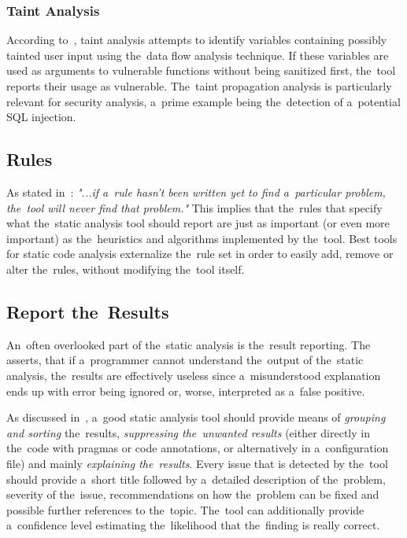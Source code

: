 \documentclass[
  digital, %
  table,   %
  lof,     %
  lot,     %
  oneside,
]{fithesis3}
\begin{document}
\subsubsection{\textbf{Taint Analysis}}
According to~\cite{oswap-sca}, taint analysis attempts to identify variables containing possibly tainted user input using the~data flow analysis technique. If these variables are used as arguments to vulnerable functions without being sanitized first, the~tool reports their usage as vulnerable. The~taint propagation analysis is particularly relevant for security analysis, a~prime example being the~detection of a~potential SQL injection.

\subsection{Rules}
As stated in~\cite{sca-for-security}: \textit{"...if a~rule hasn’t been written yet to find a~particular problem, the~tool will never find that problem."} This implies that the~rules that specify what the~static analysis tool should report are just as important (or even more important) as the~heuristics and algorithms implemented by the~tool. Best tools for static code analysis externalize the~rule set in order to easily add, remove or alter the~rules, without modifying the~tool itself.

\subsection{Report the~Results}
An~often overlooked part of the~static analysis is the~result reporting. The~\cite{coverity-sca} asserts, that if a~programmer cannot understand the~output of the~static analysis, the~results are effectively useless since a~misunderstood explanation ends up with error being ignored or, worse, interpreted as a~false positive.

As discussed in~\cite{secure-programming-with-sca}, a~good static analysis tool should provide means of \textit{grouping and sorting} the~results, \textit{suppressing the~unwanted results} (either directly in the~code with pragmas or code annotations, or alternatively in a~configuration file) and mainly \textit{explaining the~results}. Every issue that is detected by the~tool should provide a~short title followed by a~detailed description of the~problem, severity of the~issue, recommendations on how the~problem can be fixed and possible further references to the~topic. The~tool can additionally provide a~confidence level estimating the~likelihood that the~finding is really correct.
\end{document}
